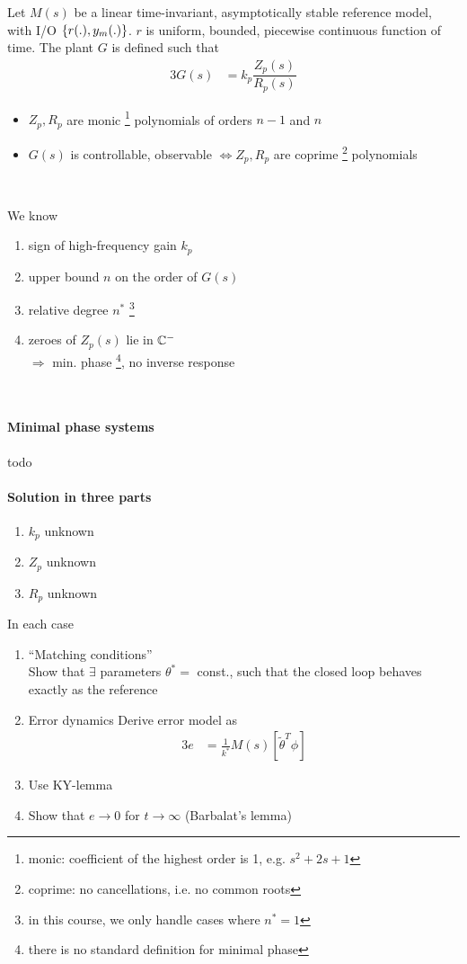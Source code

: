 Let $M(s)$ be a linear time-invariant,
asymptotically stable reference model, with I/O
$\left\lbrace r(.), y_m(.) \right\rbrace$.
$r$ is uniform, bounded, piecewise continuous function of time.
The plant $G$ is defined such that
\begin{alignat*}{3}
G(s) &= k_p \dfrac{Z_p(s)}{R_p(s)}
\end{alignat*}

\begin{itemize}
\item $Z_p, R_p$ are monic%
    \footnote{monic: coefficient of the highest order is 1, e.g. $s^2+ 2s + 1$}
    polynomials of orders $n-1$ and $n$ 
\item $G(s)$ is controllable, observable $\Leftrightarrow Z_p, R_p$ are 
    coprime%
    \footnote{coprime: no cancellations, i.e. no common roots}
    polynomials
\end{itemize}~

We know
\begin{enumerate}
\item sign of high-frequency gain $k_p$ 
\item upper bound $n$ on the order of $G(s)$ 
\item relative degree $n^*$ %
    \footnote{in this course, we only handle cases where $n^* = 1$}
\item zeroes of $Z_p(s)$ lie in $\mathbb{C}^-$\\
    $\Rightarrow$ min. phase%
    \footnote{there is no standard definition for minimal phase},
    no inverse response
\end{enumerate}~

\paragraph{Minimal phase systems}
todo

\paragraph{Solution in three parts}
\begin{enumerate}
\item $k_p$ unknown
\item $Z_p$ unknown
 \item $R_p$ unknown
\end{enumerate}

In each case
\begin{enumerate}[label=\alph*)]
\item ``Matching conditions''\\
    Show that $\exists$ parameters $\theta^* = $ const.,
    such that the closed loop behaves exactly as the reference
\item Error dynamics
    Derive error model as 
    \begin{alignat*}{3}
    e &= \frac{1}{k^*} M(s) \left[ \tilde{\theta}^T \phi \right]
    \end{alignat*}
\item Use KY-lemma
\item Show that $e \rightarrow 0$ for $t \rightarrow \infty$ 
    (Barbalat's lemma)
\end{enumerate}
